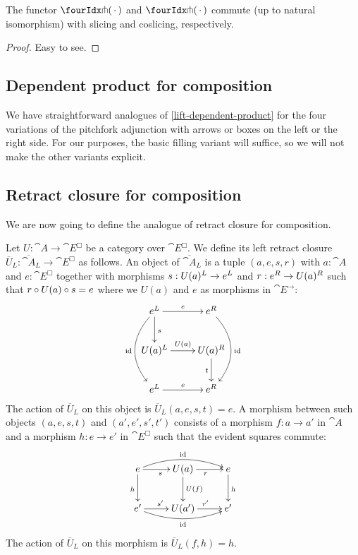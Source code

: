 \documentclass[reqno,10pt,a4paper,oneside]{amsart}
\begin{document}
\begin{lemma}
\label{pitchfork-slicing-extended}
The functor $\liftr{\brarghole}$ and $\liftl{\brarghole}$ commute (up to natural isomorphism) with slicing and coslicing, respectively.
\end{lemma}

\begin{proof}
Easy to see.
\end{proof}

\subsection{Dependent product for composition}

We have straightforward analogues of \cref{lift-dependent-product} for the four variations of the pitchfork adjunction with arrows or boxes on the left or the right side.
For our purposes, the basic filling variant will suffice, so we will not make the other variants explicit.

\subsection{Retract closure for composition}

We are now going to define the analogue of retract closure for composition.

Let $U : \cat{A} \to \cat{E}^{\Box}$ be a category over $\cat{E}^{\Box}$.
We define its left retract closure $\overline{U}_L : \overline{\cat{A}}_L \to \cat{E}^{\Box}$ as follows.
An object of $\overline{\cat{A}}_L$ is a tuple $(a, e, s, r)$ with $a : \cat{A}$ and $e : \cat{E}^{\Box}$ together with morphisms $s : U(a){}^L \to e{}^L$ and $r : e{}^R \to U(a){}^R$ such that $r \mathbin{\circ} U(a) \mathbin{\circ} s = e$ where we $U(a)$ and $e$ as morphisms in $\cat{E}^{\to}$:
\[
\xymatrix{
  e\sql
  \ar[r]^{e}
  \ar[d]^{s}
  \ar@/_2em/[dd]_{\id}
&
  e\sqr
  \ar@/^2em/[dd]^{\id}
\\
  U(a)\sql
  \ar[r]^{U(a)}
&
  U(a)\sqr
  \ar[d]_{t}
\\
  e\sql
  \ar[r]^{e}
&
  e\sqr
}
\]
The action of $\overline{U}_L$ on this object is $\overline{U}_L(a, e, s, t) = e$.
A morphism between such objects $(a, e, s, t)$ and $(a', e', s', t')$ consists of a morphism $f : a \to a'$ in $\cat{A}$ and a morphism $h : e \to e'$ in $\cat{E}^{\Box}$ such that the evident squares commute:
\[
\xymatrix{
  e
  \ar[r]_{s}
  \ar@/^1em/[rr]^{\id}
  \ar[d]_{h}
&
  U(a)
  \ar[r]_{r}
  \ar[d]^{U(f)}
&
  e
  \ar[d]^{h}
\\
  e'
  \ar[r]^{s'}
  \ar@/_1em/[rr]_{\id}
&
  U(a')
  \ar[r]^{r'}
&
  e'
}
\]
The action of $\overline{U}_L$ on this morphism is $\overline{U}_L(f, h) = h$.
\end{document}
